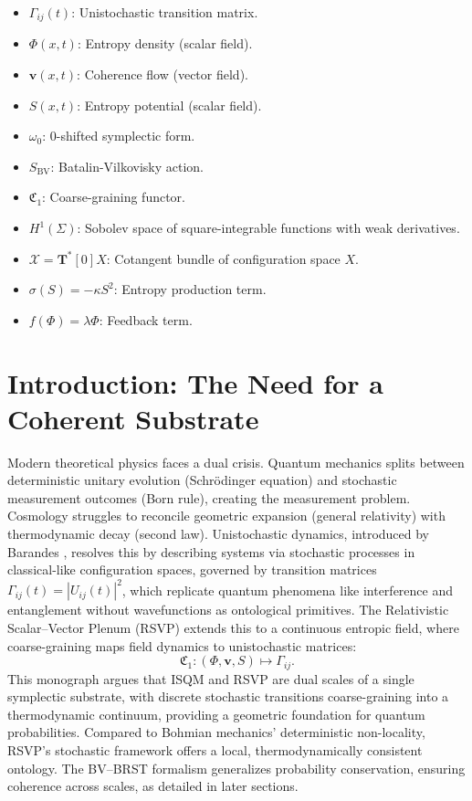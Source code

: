 \documentclass[12pt]{article}
\begin{document}
\begin{itemize}[noitemsep]
\item \(\Gamma_{ij}(t)\): Unistochastic transition matrix.
\item \(\Phi(x,t)\): Entropy density (scalar field).
\item \(\mathbf{v}(x,t)\): Coherence flow (vector field).
\item \(S(x,t)\): Entropy potential (scalar field).
\item \(\omega_0\): 0-shifted symplectic form.
\item \(S_{\mathrm{BV}}\): Batalin-Vilkovisky action.
\item \(\mathfrak{C}_1\): Coarse-graining functor.
\item \(H^1(\Sigma)\): Sobolev space of square-integrable functions with weak derivatives.
\item \(\mathcal{X} = \mathbf{T}^*[0]X\): Cotangent bundle of configuration space \(X\).
\item \(\sigma(S) = -\kappa S^2\): Entropy production term.
\item \(f(\Phi) = \lambda \Phi\): Feedback term.
\end{itemize}

\section{Introduction: The Need for a Coherent Substrate}

Modern theoretical physics faces a dual crisis. Quantum mechanics splits between deterministic unitary evolution (Schrödinger equation) and stochastic measurement outcomes (Born rule), creating the measurement problem. Cosmology struggles to reconcile geometric expansion (general relativity) with thermodynamic decay (second law). Unistochastic dynamics, introduced by Barandes \citep{Barandes2023}, resolves this by describing systems via stochastic processes in classical-like configuration spaces, governed by transition matrices \(\Gamma_{ij}(t) = |U_{ij}(t)|^2\), which replicate quantum phenomena like interference and entanglement without wavefunctions as ontological primitives. The Relativistic Scalar–Vector Plenum (RSVP) extends this to a continuous entropic field, where coarse-graining maps field dynamics to unistochastic matrices:
\[
\mathfrak{C}_1: (\Phi, \mathbf{v}, S) \mapsto \Gamma_{ij}.
\]
This monograph argues that ISQM and RSVP are dual scales of a single symplectic substrate, with discrete stochastic transitions coarse-graining into a thermodynamic continuum, providing a geometric foundation for quantum probabilities. Compared to Bohmian mechanics’ deterministic non-locality, RSVP’s stochastic framework offers a local, thermodynamically consistent ontology. The BV–BRST formalism generalizes probability conservation, ensuring coherence across scales, as detailed in later sections.
\end{document}
